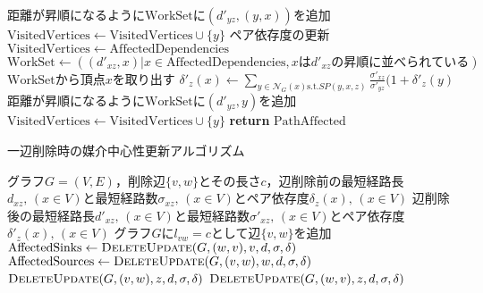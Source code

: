 \begin{algorithm}[H]
\begin{algorithmic}[1]
    \State 距離が昇順になるように$\mathrm{WorkSet}$に$(d'_{yz},(y,x))$を追加
    \State $\mathrm{VisitedVertices}\gets\mathrm{VisitedVertices}\cup\{y\}$
    \EndFor
    \EndIf
    \EndWhile
    \State\Comment ペア依存度の更新
    \State $\mathrm{VisitedVertices}\gets\mathrm{AffectedDependencies}$
    \State $\mathrm{WorkSet}\gets((d'_{xz},x)|x\in\mathrm{AffectedDependencies},x\mathrm{は}d'_{xz}\mathrm{の昇順に並べられている})$
    \State $\mathrm{WorkSet}$から頂点$x$を取り出す
    \State $\delta'_z(x)\gets\sum_{y\in\mathcal{N}_G(x)\mathrm{s.t.}SP(y,x,z)}\frac{\sigma'_{xz}}{\sigma'_{yz}}(1+\delta'_z(y)$
    \State 距離が昇順になるように$\mathrm{WorkSet}$に$(d'_{yz},y)$を追加
    \State $\mathrm{VisitedVertices}\gets\mathrm{VisitedVertices}\cup\{y\}$
    \EndFor
    \EndIf
    \EndWhile
    \State \textbf{return} $\mathrm{PathAffected}$
  \end{algorithmic}
\end{algorithm}

\begin{algorithm}[H]
  \caption{一辺削除時の媒介中心性更新アルゴリズム}
  \label{algo:update-bc-on-delete}
  \begin{algorithmic}[1]
    \Require グラフ$G=(V,E)$，削除辺$\{v,w\}$とその長さ$c$，辺削除前の最短経路長$d_{xz},\,(x\in V)$と最短経路数$\sigma_{xz},\,(x\in V)$とペア依存度$\delta_z(x),\,(x\in V)$
    \Ensure 辺削除後の最短経路長$d'_{xz},\,(x\in V)$と最短経路数$\sigma'_{xz},\,(x\in V)$とペア依存度$\delta'_z(x),\,(x\in V)$
    \State グラフ$G$に$l_{vw}=c$として辺$\{v,w\}$を追加
    \State $\mathrm{AffectedSinks}\gets\textproc{DeleteUpdate}(G,(w,v),v,d,\sigma,\delta)$
    \State $\mathrm{AffectedSources}\gets\textproc{DeleteUpdate}(G,(v,w),w,d,\sigma,\delta)$
    \State $\textproc{DeleteUpdate}(G,(v,w),z,d,\sigma,\delta)$
    \EndFor
    \State $\textproc{DeleteUpdate}(G,(w,v),z,d,\sigma,\delta)$
    \EndFor
  \end{algorithmic}
\end{algorithm}


